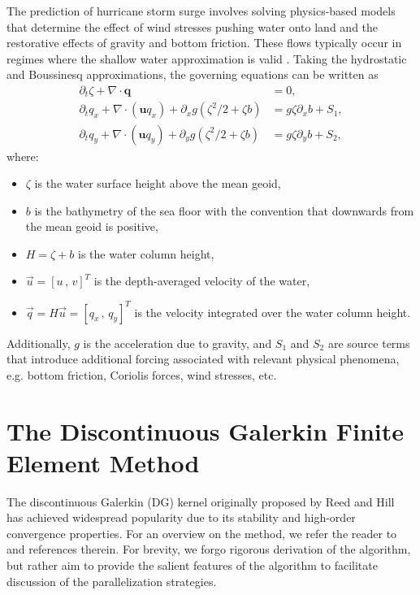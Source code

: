 The prediction of hurricane storm surge involves solving physics-based models that determine the effect of wind stresses pushing water onto land and the restorative effects of gravity and bottom friction. These flows typically occur in regimes where the shallow water approximation is valid \cite{Dutykh2016,Michoski2013}   . Taking the hydrostatic and Boussinesq approximations, the governing equations can be written as
\begin{align*}
\partial_t \zeta + \nabla \cdot \mathbf{q} &= 0,\\
\partial_t q_x + \nabla \cdot ( \mathbf{u}q_x) + \partial_x g(\zeta^2/2 + \zeta b) &= g \zeta \partial_x b + S_1,\\
\partial_t q_y + \nabla \cdot ( \mathbf{u}q_y) + \partial_y g( \zeta^2/2 + \zeta b) &= g \zeta \partial_y b + S_2,
\end{align*}
where:
\begin{itemize}
\item $\zeta$ is the water surface height above the mean geoid,
\item $b$ is the bathymetry of the sea floor with the convention that downwards from the mean geoid is positive,
\item $H = \zeta + b$ is the water column height,
\item $\vec{u} =\left[ u \, , \, v\right]^T$ is the depth-averaged velocity of the water,
\item $\vec{q} = H \vec{u} = \left[ q_x \, , \, q_y \right]^T$ is the velocity integrated over the water column height.
\end{itemize}
Additionally, $g$ is the acceleration due to gravity, and $S_1$ and $S_2$ are source terms that introduce additional forcing associated with relevant physical phenomena, e.g. bottom friction, Coriolis forces, wind stresses, etc. %



\section{The Discontinuous Galerkin Finite Element Method}
\label{sec:intro:dg}
The discontinuous Galerkin (DG) kernel originally proposed by Reed and Hill~\cite{Reed73} has achieved widespread popularity due to its stability and high-order convergence properties. For an overview on the method, we refer the reader to~\cite{Cockburn01,Hesthaven08} and references therein. For brevity, we forgo  rigorous derivation of the algorithm, but rather aim to provide the salient features of the algorithm to facilitate discussion of the parallelization strategies.

